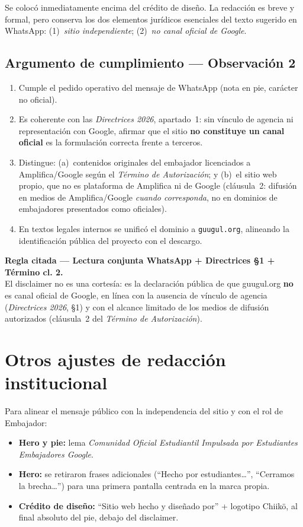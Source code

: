 \documentclass[11pt,a4paper]{article}
\newcommand{\regla}[2]{%
  \begin{reglabox}
  \noindent\textbf{Regla citada --- #1.}\\[0.35em]
  \small #2
  \end{reglabox}
}
\begin{document}
Se colocó inmediatamente encima del crédito de diseño. La redacción es breve y formal, pero conserva los dos elementos jurídicos esenciales del texto sugerido en WhatsApp: (1)~\emph{sitio independiente}; (2)~\emph{no canal oficial de Google}.

\subsection{Argumento de cumplimiento --- Observación 2}

\begin{enumerate}[leftmargin=*]
  \item Cumple el pedido operativo del mensaje de WhatsApp (nota en pie, carácter no oficial).
  \item Es coherente con las \emph{Directrices 2026}, apartado~1: sin vínculo de agencia ni representación con Google, afirmar que el sitio \textbf{no constituye un canal oficial} es la formulación correcta frente a terceros.
  \item Distingue: (a)~contenidos originales del embajador licenciados a Amplifica/Google según el \emph{Término de Autorización}; y (b)~el sitio web propio, que no es plataforma de Amplifica ni de Google (cláusula~2: difusión en medios de Amplifica/Google \emph{cuando corresponda}, no en dominios de embajadores presentados como oficiales).
  \item En textos legales internos se unificó el dominio a \texttt{guugul.org}, alineando la identificación pública del proyecto con el descargo.
\end{enumerate}

\regla{Lectura conjunta WhatsApp + Directrices §1 + Término cl. 2}{%
El disclaimer no es una cortesía: es la declaración pública de que guugul.org \textbf{no} es canal oficial de Google, en línea con la ausencia de vínculo de agencia (\emph{Directrices 2026}, §1) y con el alcance limitado de los medios de difusión autorizados (cláusula~2 del \emph{Término de Autorización}).}

\section{Otros ajustes de redacción institucional}

Para alinear el mensaje público con la independencia del sitio y con el rol de Embajador:

\begin{itemize}[leftmargin=*]
  \item \textbf{Hero y pie:} lema \emph{Comunidad Oficial Estudiantil Impulsada por Estudiantes Embajadores Google}.
  \item \textbf{Hero:} se retiraron frases adicionales (\enquote{Hecho por estudiantes\ldots}, \enquote{Cerramos la brecha\ldots}) para una primera pantalla centrada en la marca propia.
  \item \textbf{Crédito de diseño:} \enquote{Sitio web hecho y diseñado por} + logotipo Chiikö, al final absoluto del pie, debajo del disclaimer.
\end{itemize}
\end{document}
